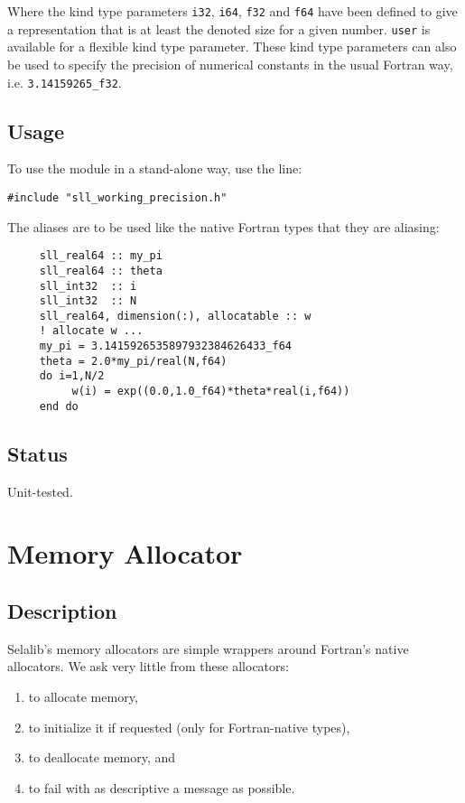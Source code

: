 \documentclass[]{report}   %
\begin{document}
Where the kind type parameters \verb+i32+, \verb+i64+, \verb+f32+ and \verb+f64+ have been defined to give a representation that is at least the denoted size for a given number. \verb+user+ is available for a flexible kind type parameter. These kind type parameters can also be used to specify the precision of numerical constants in the usual Fortran way, i.e. \verb+3.14159265_f32+.

\subsection{Usage}
To use the module in a stand-alone way, use the line:
\begin{verbatim}
#include "sll_working_precision.h"
\end{verbatim}

The aliases are to be used like the native Fortran types that they are aliasing:

\begin{verbatim}
     sll_real64 :: my_pi
     sll_real64 :: theta
     sll_int32  :: i
     sll_int32  :: N
     sll_real64, dimension(:), allocatable :: w
     ! allocate w ...
     my_pi = 3.1415926535897932384626433_f64
     theta = 2.0*my_pi/real(N,f64)
     do i=1,N/2
          w(i) = exp((0.0,1.0_f64)*theta*real(i,f64))
     end do
\end{verbatim}

\subsection{Status}
Unit-tested.

\section{Memory Allocator}
\subsection{Description}
Selalib's memory allocators are simple wrappers around Fortran's native allocators. We ask very little from these allocators:
\begin{enumerate}
\item to allocate memory, 
\item to initialize it if requested (only for Fortran-native types), 
\item to deallocate memory, and 
\item to fail with as descriptive a message as possible.
\end{enumerate}
\end{document}
